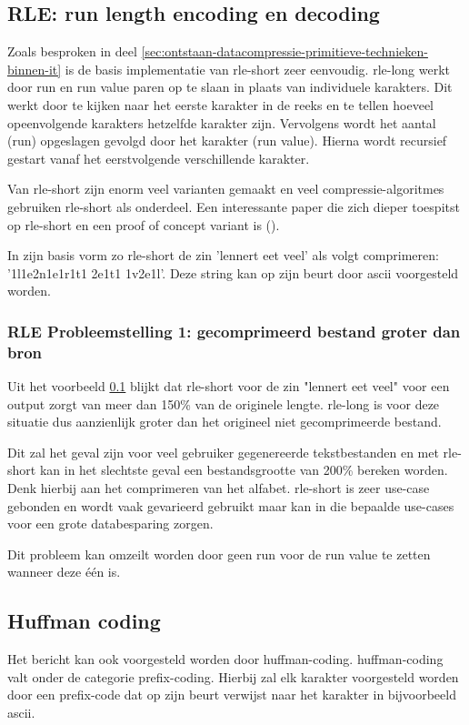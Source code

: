 \subsection{RLE: run length encoding en decoding}
\label{sec:primitieve-technieken-voorbeeld-rle}
Zoals besproken in deel \ref{sec:ontstaan-datacompressie-primitieve-technieken-binnen-it} is de basis implementatie van \gls{rle-short} zeer eenvoudig. \Gls{rle-long} werkt door run en run value paren op te slaan in plaats van individuele karakters. Dit werkt door te kijken naar het eerste karakter in de reeks en te tellen hoeveel opeenvolgende karakters hetzelfde karakter zijn. Vervolgens wordt het aantal (run) opgeslagen gevolgd door het karakter (run value). Hierna wordt recursief gestart vanaf het eerstvolgende verschillende karakter.

Van \gls{rle-short} zijn enorm veel varianten gemaakt en veel \glspl{compressie-algoritme} gebruiken \gls{rle-short} als onderdeel. Een interessante paper die zich dieper toespitst op \gls{rle-short} en een proof of concept variant is  (\cite{rleimproved}). 

In zijn basis vorm zo \gls{rle-short} de zin 'lennert eet veel' als volgt comprimeren: 
'1l1e2n1e1r1t1 2e1t1 1v2e1l'. Deze string kan op zijn beurt door \gls{ascii} voorgesteld worden.

\subsubsection{RLE Probleemstelling 1: gecomprimeerd bestand groter dan bron}
\label{sec:primitieve-technieken-voorbeeld-rle-probleem-1}
Uit het voorbeeld \ref{sec:primitieve-technieken-voorbeeld-rle} blijkt dat \gls{rle-short} voor de zin "lennert eet veel" voor een output zorgt van meer dan 150\% van de originele lengte. \Gls{rle-long} is voor deze situatie dus aanzienlijk groter dan het origineel niet gecomprimeerde bestand. 

Dit zal het geval zijn voor veel gebruiker gegenereerde tekstbestanden en met \gls{rle-short} kan in het slechtste geval een bestandsgrootte van 200\% bereken worden. Denk hierbij aan het comprimeren van het alfabet. \Gls{rle-short} is zeer \gls{use-case} gebonden en wordt vaak gevarieerd gebruikt maar kan in die bepaalde \glspl{use-case} voor een grote databesparing zorgen.

Dit probleem kan omzeilt worden door geen run voor de run value te zetten wanneer deze één is. 

\subsection{Huffman coding}
\label{sec:primitieve-technieken-voorbeeld-huffman-encoding}
Het bericht kan ook voorgesteld worden door \gls{huffman-coding}. \gls{huffman-coding} valt onder de categorie \gls{prefix-coding}. Hierbij zal elk karakter voorgesteld worden door een \gls{prefix-code} dat op zijn beurt verwijst naar het karakter in bijvoorbeeld \gls{ascii}. 

